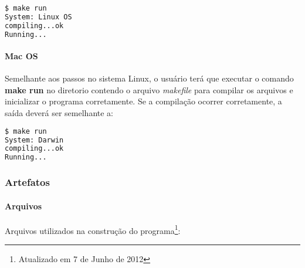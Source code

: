 \begin{lstlisting}[language=bash,title=\textit{Saída do terminal - Linux},numbers=none]
$ make run
System: Linux OS
compiling...ok
Running...
\end{lstlisting}

\paragraph{\textbf{Mac OS}}

Semelhante aos passos no sistema Linux, o usuário terá que executar o comando \textbf{make run} no diretorio contendo o arquivo \textit{makefile} para compilar os arquivos e inicializar o programa corretamente. Se a compilação ocorrer corretamente, a saída deverá ser semelhante a:

\begin{lstlisting}[language=bash,title=\textit{Saída do terminal - Mac OS},numbers=none]
$ make run
System: Darwin
compiling...ok
Running...
\end{lstlisting}


\subsubsection{Artefatos}\label{artefatos}

\paragraph{\textbf{Arquivos}}

Arquivos utilizados na construção do programa\footnote{Atualizado em 7 de Junho de 2012}:\\

